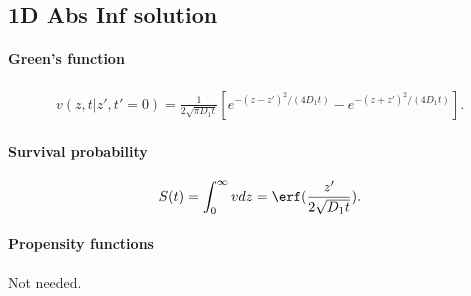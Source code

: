 \subsection{1D Abs Inf solution}

\paragraph{Green's function}
\begin{align}
  v(z,t|z',t'=0) = \frac{1}{2\sqrt{\pi D_1t}}
  [ e^{-(z-z')^2/(4 D_1 t)} - e^{-(z+z')^2/(4 D_1 t)} ].
\end{align}


\paragraph{Survival probability}
\begin{align}
  S(t) = \int_0^\infty v dz =
  \erf(\frac{z'}{2\sqrt{D_1 t}}).
\end{align}


\paragraph{Propensity functions}
Not needed.
